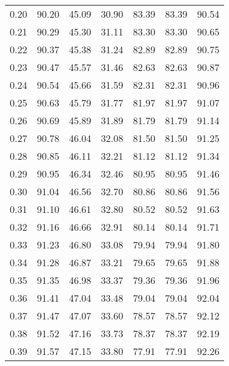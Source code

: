 \begin{tabular}{|c|c|c|c|c|c|c|}
      0.20 &     90.20 &     45.09 &      30.90 &   83.39 &      83.39 &         90.54 \\
      0.21 &     90.29 &     45.30 &      31.11 &   83.30 &      83.30 &         90.65 \\
      0.22 &     90.37 &     45.38 &      31.24 &   82.89 &      82.89 &         90.75 \\
      0.23 &     90.47 &     45.57 &      31.46 &   82.63 &      82.63 &         90.87 \\
      0.24 &     90.54 &     45.66 &      31.59 &   82.31 &      82.31 &         90.96 \\
      0.25 &     90.63 &     45.79 &      31.77 &   81.97 &      81.97 &         91.07 \\
      0.26 &     90.69 &     45.89 &      31.89 &   81.79 &      81.79 &         91.14 \\
      0.27 &     90.78 &     46.04 &      32.08 &   81.50 &      81.50 &         91.25 \\
      0.28 &     90.85 &     46.11 &      32.21 &   81.12 &      81.12 &         91.34 \\
      0.29 &     90.95 &     46.34 &      32.46 &   80.95 &      80.95 &         91.46 \\
      0.30 &     91.04 &     46.56 &      32.70 &   80.86 &      80.86 &         91.56 \\
      0.31 &     91.10 &     46.61 &      32.80 &   80.52 &      80.52 &         91.63 \\
      0.32 &     91.16 &     46.66 &      32.91 &   80.14 &      80.14 &         91.71 \\
      0.33 &     91.23 &     46.80 &      33.08 &   79.94 &      79.94 &         91.80 \\
      0.34 &     91.28 &     46.87 &      33.21 &   79.65 &      79.65 &         91.88 \\
      0.35 &     91.35 &     46.98 &      33.37 &   79.36 &      79.36 &         91.96 \\
      0.36 &     91.41 &     47.04 &      33.48 &   79.04 &      79.04 &         92.04 \\
      0.37 &     91.47 &     47.07 &      33.60 &   78.57 &      78.57 &         92.12 \\
      0.38 &     91.52 &     47.16 &      33.73 &   78.37 &      78.37 &         92.19 \\
      0.39 &     91.57 &     47.15 &      33.80 &   77.91 &      77.91 &         92.26 \\

\end{tabular}

